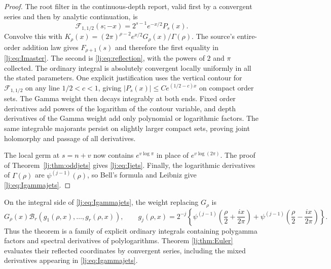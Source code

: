 \begin{proof}
The root filter in the continuous-depth report, valid first by a
convergent series and then by analytic continuation, is
\[
 \mathcal F_{1,1/2}(s;-x)=2^{s-1}e^{-x/2}P_s(x).
\]
Convolve this with
$K_\rho(x)=(2\pi)^{\rho-2}e^{x/2}G_\rho(x)/\Gamma(\rho)$.
The source's entire-order addition law gives $F_{\rho+1}(s)$ and
therefore the first equality in \eqref{lj:eq:Imaster}. The second is
\eqref{lj:eq:reflection}, with the powers of $2$ and $\pi$ collected.
The ordinary integral is absolutely convergent locally uniformly in
all the stated parameters. One explicit justification uses the vertical
contour for $\mathcal F_{1,1/2}$ on any line $1/2<c<1$, giving
$|P_s(x)|\leq C e^{(1/2-c)x}$ on compact order sets. The Gamma weight
then decays integrably at both ends. Fixed order derivatives add powers
of the logarithm of the contour variable, and depth derivatives of the
Gamma weight add only polynomial or logarithmic factors. The same
integrable majorants persist on slightly larger compact sets, proving
joint holomorphy and passage of all derivatives.

The local germ at $s=n+v$ now contains $e^{v\log\pi}$ in place of
$e^{v\log(2\pi)}$. The proof of Theorem~\ref{lj:thm:oddjets} gives
\eqref{lj:eq:Ijets}. Finally, the logarithmic derivatives of
$\Gamma(\rho)$ are $\psi^{(j-1)}(\rho)$, so Bell's formula and Leibniz
give \eqref{lj:eq:Igammajets}.
\end{proof}

On the integral side of \eqref{lj:eq:Igammajets}, the weight replacing
$G_\rho$ is
\[
 G_\rho(x)\mathcal B_r(g_1(\rho,x),\ldots,g_r(\rho,x)),\qquad
 g_j(\rho,x)=2^{-j}\left\{
 \psi^{(j-1)}\left(\frac\rho2+\frac{ix}{2\pi}\right)
 +\psi^{(j-1)}\left(\frac\rho2-\frac{ix}{2\pi}\right)\right\}.
\]
Thus the theorem is a family of explicit ordinary integrals containing
polygamma factors and spectral derivatives of polylogarithms. Theorem
\ref{lj:thm:Euler} evaluates their reflected coordinates by convergent
series, including the mixed derivatives appearing in
\eqref{lj:eq:Igammajets}.

